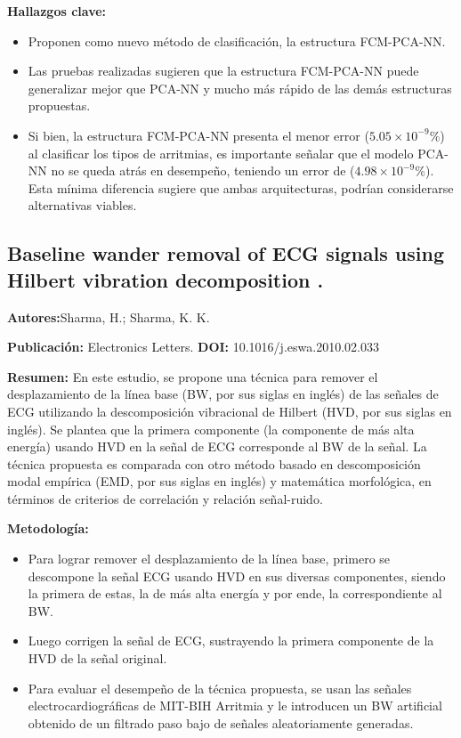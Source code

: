 \documentclass[spanish,11pt,letterpaper,oneside]{memoir}
\begin{document}
\textbf{Hallazgos clave:}
\begin{itemize}
	\item Proponen como nuevo método de clasificación, la estructura FCM-PCA-NN.
	\item Las pruebas realizadas sugieren que la estructura FCM-PCA-NN puede generalizar mejor que PCA-NN y mucho más rápido de las demás estructuras propuestas.
	\item Si bien, la estructura FCM-PCA-NN presenta el menor error ($5.05\times10^{-9} \% $) al clasificar los tipos de arritmias, es importante señalar que el modelo PCA-NN no se queda atrás en desempeño, teniendo un error de ($4.98\times10^{-9} \%$). Esta mínima diferencia sugiere que ambas arquitecturas, podrían considerarse alternativas viables.
\end{itemize}

\subsection{Baseline wander removal of ECG signals using Hilbert vibration decomposition \cite{Sharma15}.}

\textbf{Autores:}Sharma, H.; Sharma, K. K.

\textbf{Publicación:} Electronics Letters.
\textbf{DOI:} 10.1016/j.eswa.2010.02.033

\textbf{Resumen:} En este estudio, se propone una técnica para remover el desplazamiento de la línea base (BW, por sus siglas en inglés) de las señales de ECG utilizando la descomposición vibracional de Hilbert (HVD, por sus siglas en inglés). Se plantea que la primera componente (la componente de más alta energía) usando HVD en la señal de ECG corresponde al BW de la señal. La técnica propuesta es comparada con otro método basado en descomposición modal empírica (EMD, por sus siglas en inglés) y matemática morfológica, en términos de criterios de correlación y relación señal-ruido. 

\textbf{Metodología:}
\begin{itemize}
	\item Para lograr remover el desplazamiento de la línea base, primero se descompone la señal ECG usando HVD en sus diversas componentes, siendo la primera de estas, la de más alta energía y por ende, la correspondiente al BW.
	\item Luego corrigen la señal de ECG, sustrayendo la primera componente de la HVD de la señal original.
	\item Para evaluar el desempeño de la técnica propuesta, se usan las señales electrocardiográficas de MIT-BIH Arritmia \cite{arritmiadb} y le introducen un BW artificial obtenido de un filtrado paso bajo de señales aleatoriamente generadas.
\end{itemize}
\end{document}
